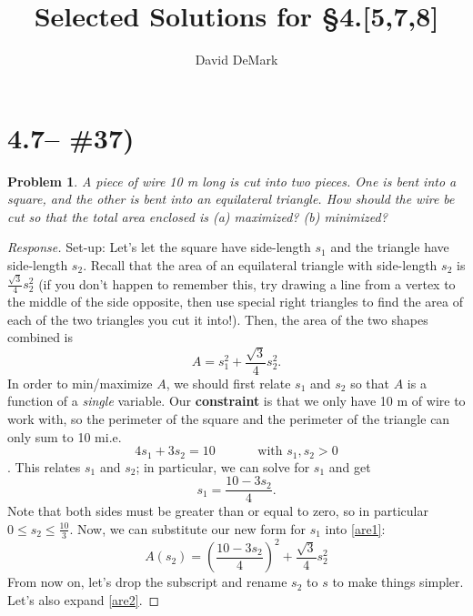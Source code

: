 \documentclass[english]{article}
\title{Selected Solutions for \S 4.[5,7,8]}
\author{David DeMark}
\date{\due}
\newtheorem*{problem*}{Problem}
\theoremstyle{remark}
\theoremstyle{definition}
\begin{document}
	\maketitle

	\section*{4.7-- \#37)}
	\begin{problem*}
	A piece of wire 10 m long is cut into two pieces. One is bent into a square, and the other is bent into an equilateral triangle. How should the wire be cut so that the total area enclosed is (a) maximized? (b) minimized?
	\end{problem*}
\begin{proof}[Response]
Set-up: Let's let the square have side-length $s_1$ and the triangle have side-length $s_2$. Recall that the area of an equilateral triangle with side-length $s_2$ is $\frac{\sqrt 3}{4}s_2^2$ (if you don't happen to remember this, try drawing a line from a vertex to the middle of the side opposite, then use special right triangles to find the area of each of the two triangles you cut it into!). Then, the area of the two shapes combined is \begin{equation}\label{are1}A=s_1^2+\frac{\sqrt{3}}{4}s_2^2.\end{equation} In order to min/maximize $A$, we should first relate $s_1$ and $s_2$ so that $A$ is a function of a \emph{single} variable. Our \textbf{{constraint}} is that we only have 10 m of wire to work with, so the perimeter of the square and the perimeter of the triangle can only sum to 10 m\textemdash i.e. $$4s_1+3s_2=10\hspace{3em}\text{ with }s_1,s_2>0$$. This relates $s_1$ and $s_2$; in particular, we can solve for $s_1$ and get $$s_1=\frac{10-3s_2}{4}.$$ Note that both sides must be greater than or equal to zero, so in particular $0\leq s_2\leq \frac{10}{3}$. Now, we can substitute our new form for $s_1$ into \eqref{are1}:
\begin{equation}
\label{are2}	A(s_2)=\left(\frac{10-3s_2}{4}\right)^2+\frac{\sqrt{3}}{4}s_2^2
\end{equation}
From now on, let's drop the subscript and rename $s_2$ to $s$ to make things simpler. Let's also expand \eqref{are2}.


\end{proof}
\end{document}
